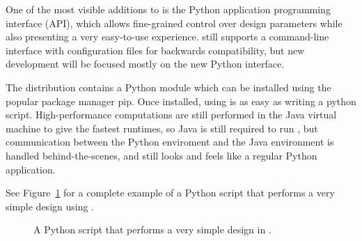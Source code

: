 
One of the most visible additions to  is the Python application programming interface (API), which allows fine-grained control over design parameters while also presenting a very easy-to-use experience.  still supports a command-line interface with configuration files for backwards compatibility, but new development will be focused mostly on the new Python interface. 

The  distribution contains a Python module which can be installed using the popular package manager {\sc pip}. Once installed, using  is as easy as writing a python script. High-performance computations are still performed in the Java virtual machine to give the fastest runtimes, so Java is still required to run , but communication between the Python enviroment and the Java environment is handled behind-the-scenes, and  still looks and feels like a regular Python application.

See Figure~\ref{fig:python} for a complete example of a Python script that performs a very simple design using .

\begin{figure}\label{fig:python}
{
	
}
\caption{A Python script that performs a very simple design in .}
\end{figure}
